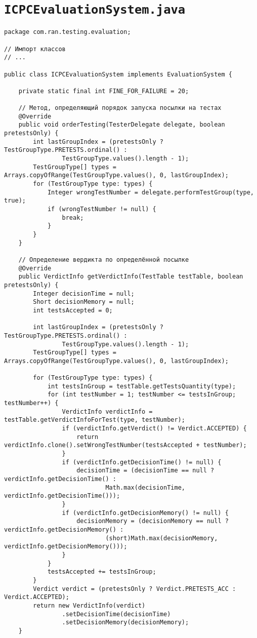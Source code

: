 \section*{\texttt{ICPCEvaluationSystem.java}}
\begin{verbatim}
package com.ran.testing.evaluation;

// Импорт классов
// ...

public class ICPCEvaluationSystem implements EvaluationSystem {

    private static final int FINE_FOR_FAILURE = 20;
    
    // Метод, определяющий порядок запуска посылки на тестах
    @Override
    public void orderTesting(TesterDelegate delegate, boolean pretestsOnly) {
        int lastGroupIndex = (pretestsOnly ? TestGroupType.PRETESTS.ordinal() :
                TestGroupType.values().length - 1);
        TestGroupType[] types = Arrays.copyOfRange(TestGroupType.values(), 0, lastGroupIndex);
        for (TestGroupType type: types) {
            Integer wrongTestNumber = delegate.performTestGroup(type, true);
            if (wrongTestNumber != null) {
                break;
            }
        }
    }
    
    // Определение вердикта по определённой посылке
    @Override
    public VerdictInfo getVerdictInfo(TestTable testTable, boolean pretestsOnly) {
        Integer decisionTime = null;
        Short decisionMemory = null;
        int testsAccepted = 0;
        
        int lastGroupIndex = (pretestsOnly ? TestGroupType.PRETESTS.ordinal() :
                TestGroupType.values().length - 1);
        TestGroupType[] types = Arrays.copyOfRange(TestGroupType.values(), 0, lastGroupIndex);
        
        for (TestGroupType type: types) {
            int testsInGroup = testTable.getTestsQuantity(type);
            for (int testNumber = 1; testNumber <= testsInGroup; testNumber++) {
                VerdictInfo verdictInfo = testTable.getVerdictInfoForTest(type, testNumber);
                if (verdictInfo.getVerdict() != Verdict.ACCEPTED) {
                    return verdictInfo.clone().setWrongTestNumber(testsAccepted + testNumber);
                }
                if (verdictInfo.getDecisionTime() != null) {
                    decisionTime = (decisionTime == null ? verdictInfo.getDecisionTime() :
                            Math.max(decisionTime, verdictInfo.getDecisionTime()));
                }
                if (verdictInfo.getDecisionMemory() != null) {
                    decisionMemory = (decisionMemory == null ? verdictInfo.getDecisionMemory() :
                            (short)Math.max(decisionMemory, verdictInfo.getDecisionMemory()));
                }
            }
            testsAccepted += testsInGroup;
        }
        Verdict verdict = (pretestsOnly ? Verdict.PRETESTS_ACC : Verdict.ACCEPTED);
        return new VerdictInfo(verdict)
                .setDecisionTime(decisionTime)
                .setDecisionMemory(decisionMemory);
    }


\end{verbatim}
